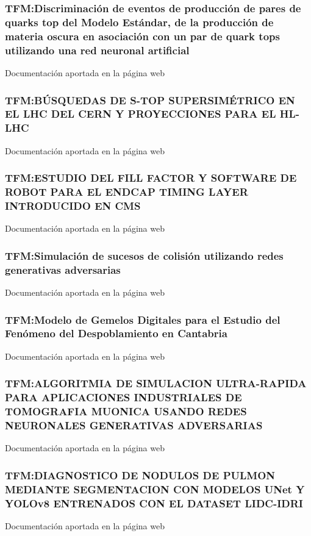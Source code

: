 \documentclass[a4paper, 11pt, twoside, openright]{report}
\begin{document}
\subsubsection{TFM:Discriminación de eventos de producción de pares de quarks top del Modelo Estándar, de la producción de materia oscura en asociación con un par de quark tops utilizando una red neuronal artificial}
Documentación aportada en la página web

\subsubsection{TFM:BÚSQUEDAS DE S-TOP SUPERSIMÉTRICO EN EL LHC DEL CERN Y PROYECCIONES PARA EL HL-LHC}
Documentación aportada en la página web

\subsubsection{TFM:ESTUDIO DEL FILL FACTOR Y SOFTWARE DE ROBOT PARA EL ENDCAP TIMING LAYER INTRODUCIDO EN CMS}
Documentación aportada en la página web

\subsubsection{TFM:Simulación de sucesos de colisión utilizando redes generativas adversarias}
Documentación aportada en la página web

\subsubsection{TFM:Modelo de Gemelos Digitales para el Estudio del Fenómeno del Despoblamiento en Cantabria}
Documentación aportada en la página web

\subsubsection{TFM:ALGORITMIA DE SIMULACION ULTRA-RAPIDA PARA APLICACIONES INDUSTRIALES DE TOMOGRAFIA MUONICA USANDO REDES NEURONALES GENERATIVAS ADVERSARIAS}
Documentación aportada en la página web

\subsubsection{TFM:DIAGNOSTICO DE NODULOS DE PULMON MEDIANTE SEGMENTACION CON MODELOS UNet Y YOLOv8 ENTRENADOS CON EL DATASET LIDC-IDRI}
Documentación aportada en la página web
\end{document}
